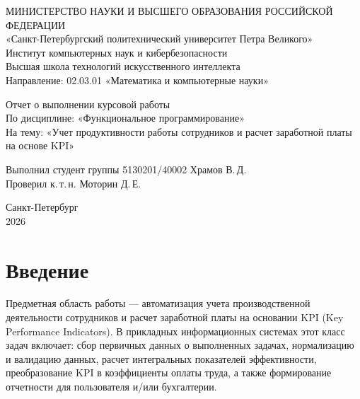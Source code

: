 \documentclass[a4paper,14pt]{extarticle}
\begin{document}
\begin{titlepage}
\thispagestyle{empty}
\begin{center}
{\large МИНИСТЕРСТВО НАУКИ И ВЫСШЕГО ОБРАЗОВАНИЯ РОССИЙСКОЙ ФЕДЕРАЦИИ}\\
{\large «Санкт-Петербургский политехнический университет Петра Великого»}\\
Институт компьютерных наук и кибербезопасности\\
Высшая школа технологий искусственного интеллекта\\
Направление: 02.03.01 «Математика и компьютерные науки»

\vspace{3cm}
{\large Отчет о выполнении курсовой работы}\\
По дисциплине: «Функциональное программирование»\\
На тему: «Учет продуктивности работы сотрудников и расчет заработной платы на основе KPI»
\end{center}

\vspace{3cm}
\noindent Выполнил студент группы 5130201/40002 \hfill \underline{\hspace{3cm}} Храмов В.\,Д.\\[0.8cm]
\noindent Проверил к.\,т.\,н. \hfill \underline{\hspace{3cm}} Моторин Д.\,Е.

\vfill
\begin{center}
Санкт-Петербург\\
2026
\end{center}
\end{titlepage}

\setcounter{page}{2}

\tableofcontents
\newpage

\section*{Введение}

Предметная область работы --- автоматизация учета производственной деятельности сотрудников и расчет заработной платы на основании KPI (Key Performance Indicators). В прикладных информационных системах этот класс задач включает: сбор первичных данных о выполненных задачах, нормализацию и валидацию данных, расчет интегральных показателей эффективности, преобразование KPI в коэффициенты оплаты труда, а также формирование отчетности для пользователя и/или бухгалтерии.
\end{document}
